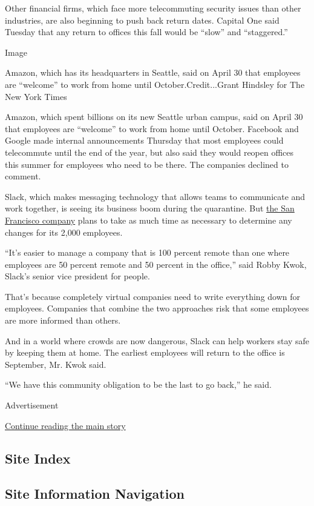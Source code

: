 Other financial firms, which face more telecommuting security issues
than other industries, are also beginning to push back return dates.
Capital One said Tuesday that any return to offices this fall would be
``slow'' and ``staggered.''

Image

Amazon, which has its headquarters in Seattle, said on April 30 that
employees are ``welcome'' to work from home until October.Credit...Grant
Hindsley for The New York Times

Amazon, which spent billions on its new Seattle urban campus, said on
April 30 that employees are ``welcome'' to work from home until October.
Facebook and Google made internal announcements Thursday that most
employees could telecommute until the end of the year, but also said
they would reopen offices this summer for employees who need to be
there. The companies declined to comment.

Slack, which makes messaging technology that allows teams to communicate
and work together, is seeing its business boom during the quarantine.
But
\href{https://www.nytimes.com/2019/06/02/technology/slack-stewart-butterfield.html}{the
San Francisco company} plans to take as much time as necessary to
determine any changes for its 2,000 employees.

``It's easier to manage a company that is 100 percent remote than one
where employees are 50 percent remote and 50 percent in the office,''
said Robby Kwok, Slack's senior vice president for people.

That's because completely virtual companies need to write everything
down for employees. Companies that combine the two approaches risk that
some employees are more informed than others.

And in a world where crowds are now dangerous, Slack can help workers
stay safe by keeping them at home. The earliest employees will return to
the office is September, Mr. Kwok said.

``We have this community obligation to be the last to go back,'' he
said.

Advertisement

\protect\hyperlink{after-bottom}{Continue reading the main story}

\hypertarget{site-index}{%
\subsection{Site Index}\label{site-index}}

\hypertarget{site-information-navigation}{%
\subsection{Site Information
Navigation}\label{site-information-navigation}}

